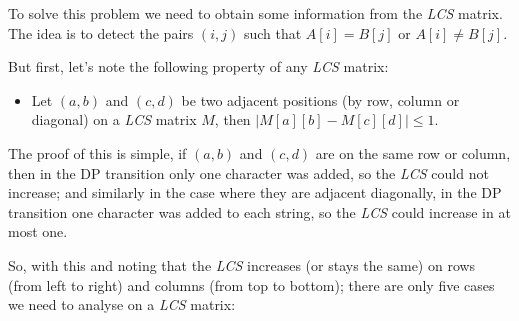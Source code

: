 To solve this problem we need to obtain some information from the \textit{LCS}
matrix. The idea is to detect the pairs $(i, j)$ such that $A[i] = B[j]$ or
$A[i] \neq B[j]$.

But first, let's note the following property of any \textit{LCS} matrix:

\begin{itemize}

    \item Let $(a, b)$ and $(c, d)$ be two adjacent positions (by row, column
        or diagonal) on a \textit{LCS} matrix $M$, then  $|M[a][b] - M[c][d]|
        \le 1$.

\end{itemize}

The proof of this is simple, if $(a, b)$ and $(c, d)$ are on the same row or
column, then in the DP transition only one character was added, so the
\textit{LCS} could not increase; and similarly in the case where they are
adjacent diagonally, in the DP transition one character was added to each
string, so the \textit{LCS} could increase in at most one.

So, with this and noting that the \textit{LCS} increases (or stays the same) on
rows (from left to right) and columns (from top to bottom); there are only five
cases we need to analyse on a \textit{LCS} matrix:

